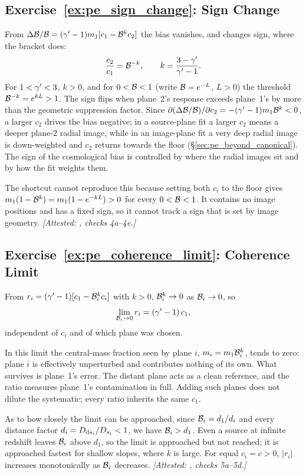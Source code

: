 \subsection*{Exercise~\ref{ex:pe_sign_change}: Sign Change}

From $\Delta\mathcal{B}/\mathcal{B}=(\gamma'-1)m_1[c_1-\mathcal{B}^{k}c_2]$ the bias
vanishes, and changes sign, where the bracket does:
\[
  \frac{c_2}{c_1}=\mathcal{B}^{-k},\qquad k=\frac{3-\gamma'}{\gamma'-1}.
\]
For $1<\gamma'<3$, $k>0$, and for $0<\mathcal{B}<1$ (write $\mathcal{B}=e^{-L}$, $L>0$)
the threshold $\mathcal{B}^{-k}=e^{kL}>1$. The sign flips when plane~2's
response exceeds plane~1's by more than the geometric suppression
factor. Since $\partial(\Delta\mathcal{B}/\mathcal{B})/\partial c_2=-(\gamma'-1)m_1\mathcal{B}^k<0$,
a larger $c_2$ drives the bias negative; in a source-plane fit a larger
$c_2$ means a deeper plane-2 radial image, while in an image-plane fit
a very deep radial image is down-weighted and $c_2$ returns towards the
floor (\S\ref{sec:pe_beyond_canonical}). The sign of the cosmological
bias is controlled by where the radial images sit and by how the fit
weights them.

The shortcut cannot reproduce this because setting both $c_i$ to the floor gives
$m_1(1-\mathcal{B}^{k})=m_1(1-e^{-kL})>0$ for every $0<\mathcal{B}<1$. It
contains no image positions and has a fixed sign, so it cannot track a
sign that is set by image geometry.
\emph{[Attested: , checks 4a--4e.]}

\subsection*{Exercise~\ref{ex:pe_coherence_limit}: Coherence Limit}

From $r_i=(\gamma'-1)[c_1-\mathcal{B}_i^{k}c_i]$ with $k>0$, $\mathcal{B}_i^{k}\to0$ as
$\mathcal{B}_i\to0$, so
\[
  \lim_{\mathcal{B}_i\to0}r_i=(\gamma'-1)\,c_1,
\]
independent of $c_i$ and of which plane was chosen.

In this limit the central-mass fraction seen by
plane $i$, $m_i=m_1\mathcal{B}_i^{k}$, tends to zero: plane $i$ is
effectively unperturbed and contributes nothing of its own. What
survives is plane~1's error. The distant plane acts as a clean
reference, and the ratio measures plane~1's contamination in full.
Adding such planes does not dilute the systematic; every ratio inherits
the same $c_1$.

As to how closely the limit can be approached, since $\mathcal{B}_i=d_1/d_i$ and every distance factor
$d_i=D_{{\rm d}s_i}/D_{s_i}<1$, we have $\mathcal{B}_i>d_1$. Even a source at
infinite redshift leaves $\mathcal{B}_i$ above $d_1$, so the limit is
approached but not reached; it is approached fastest for shallow slopes,
where $k$ is large. For equal $c_i=c>0$, $|r_i|$ increases
monotonically as $\mathcal{B}_i$ decreases.
\emph{[Attested: , checks 5a--5d.]}

